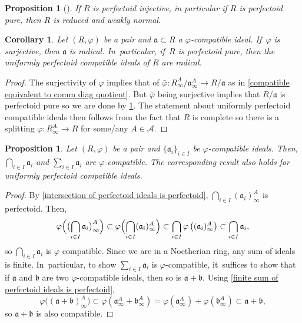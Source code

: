 \documentclass[11pt]{article}
\let\autoref\cref
\theoremstyle{plain}
\newtheorem{corollary}[theorem]{Corollary}
\newtheorem{proposition}[theorem]{Proposition}
\theoremstyle{definition}
\numberwithin{equation}{theorem}
\newcommand{\fra}{\mathfrak{a}}
\newcommand{\frab}{\mathfrak{b}}
\newcommand{\sA}{\mathcal{A}}
\renewcommand{\phi}{\varphi}
\newcommand{\rphi}{(R,\phi)}
\newcommand{\rafty}{R^A_\infty}
\newcommand{\aafty}{\fra^A_\infty}
\newcommand{\bafty}{\frab^A_\infty}
\begin{document}
\begin{proposition}[{\cite[Lem.\,4.29]{BMPSTWWPerfectoidPure}}]\label{perfectoid injective rings are reduced and WN}
If $R$ is perfectoid injective, in particular if $R$ is perfectoid pure, then $R$ is reduced and weakly normal.
\end{proposition}

\begin{corollary}\label{compatible ideals are radical}
Let $\rphi$ be a pair and $\fra\subset R$ a $\phi$-compatible ideal. If~$\phi$ is surjective, then $\fra$ is radical. In~particular, if~$R$ is perfectoid pure, then the uniformly perfectoid compatible ideals of $R$ are radical.
\end{corollary}

\begin{proof}
The surjectivity of $\phi$ implies that of $\bar{\phi}\colon \rafty/\aafty\to R/\fra$ as in \autoref{compatible equivalent to comm diag quotient}.
But $\bar{\phi}$ being surjective implies that $R/\fra$ is perfectoid pure so we are done by \autoref{perfectoid injective rings are reduced and WN}. The statement about uniformly perfectoid compatible ideals then follows from the fact that $R$ is complete so there is a splitting $\phi\colon \rafty \to R$ for some/any $A\in \sA$.
\end{proof}

\begin{proposition}\label{lemma compatible ideals closed under sums intersection}
Let $\rphi$ be a pair and $\{\fra_i\}_{i\in I}$ be $\phi$-compatible ideals. Then, $\bigcap_{i\in I} \fra_i$ and $\sum_{i\in I} \fra_i$ are $\phi$-compatible. The corresponding result also holds for uniformly perfectoid compatible ideals.
\end{proposition}

\begin{proof}
By \autoref{intersection of perfectoid ideals is perfectoid}, $\bigcap_{i\in I} (\fra_i)^A_\infty$ is perfectoid.
Then,\vspace*{-3pt}
\[\phi\Bigl(\bigl(\bigcap_{i\in I} \fra_i\bigr)^A_\infty\Bigr)\subset \phi \Bigl(\bigcap_{i\in I} (\fra_i)^A_\infty \Bigr)\subset \bigcap_{i\in I} \phi\left((\fra_i)^A_\infty\right)\subset \bigcap_{i\in I} \fra_i,
\]
so $\bigcap_{i\in I} \fra_i$ is $\phi$ compatible. Since we are in a Noetherian ring, any sum of ideals is finite. In~particular, to show $\sum_{i\in I} \fra_i$ is $\phi$-compatible, it~suffices to show that if $\fra$ and $\frab$ are two $\phi$-compatible ideals, then so is $\fra+\frab$.
Using \autoref{finite sum of perfectoid ideals is perfectoid},\vspace*{-3pt}
\[\phi \bigl((\fra+ \frab)^A_\infty \bigr)\subset\phi\left(\aafty+ \bafty\right) = \phi\left(\aafty\right)+\phi\left(\bafty\right)\subset \fra + \frab,
\]
so $\fra+\frab$ is also compatible.
\end{proof}
\end{document}
